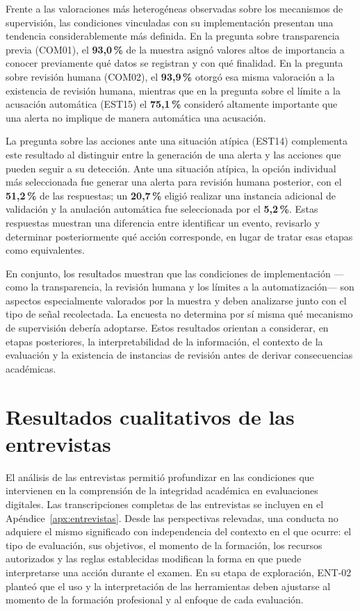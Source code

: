 Frente a las valoraciones más heterogéneas observadas sobre los mecanismos de supervisión, las condiciones vinculadas con su implementación presentan una tendencia considerablemente más definida. En la pregunta sobre transparencia previa (COM01), el \textbf{93,0\,\%} de la muestra asignó valores altos de importancia a conocer previamente qué datos se registran y con qué finalidad. En la pregunta sobre revisión humana (COM02), el \textbf{93,9\,\%} otorgó esa misma valoración a la existencia de revisión humana, mientras que en la pregunta sobre el límite a la acusación automática (EST15) el \textbf{75,1\,\%} consideró altamente importante que una alerta no implique de manera automática una acusación.

La pregunta sobre las acciones ante una situación atípica (EST14) complementa este resultado al distinguir entre la generación de una alerta y las acciones que pueden seguir a su detección. Ante una situación atípica, la opción individual más seleccionada fue generar una alerta para revisión humana posterior, con el \textbf{51,2\,\%} de las respuestas; un \textbf{20,7\,\%} eligió realizar una instancia adicional de validación y la anulación automática fue seleccionada por el \textbf{5,2\,\%}. Estas respuestas muestran una diferencia entre identificar un evento, revisarlo y determinar posteriormente qué acción corresponde, en lugar de tratar esas etapas como equivalentes.

En conjunto, los resultados muestran que las condiciones de implementación ---como la transparencia, la revisión humana y los límites a la automatización--- son aspectos especialmente valorados por la muestra y deben analizarse junto con el tipo de señal recolectada. La encuesta no determina por sí misma qué mecanismo de supervisión debería adoptarse. Estos resultados orientan a considerar, en etapas posteriores, la interpretabilidad de la información, el contexto de la evaluación y la existencia de instancias de revisión antes de derivar consecuencias académicas.

\section{Resultados cualitativos de las entrevistas}

El análisis de las entrevistas permitió profundizar en las condiciones que intervienen en la comprensión de la integridad académica en evaluaciones digitales. Las transcripciones completas de las entrevistas se incluyen en el Apéndice~\ref{apx:entrevistas}. Desde las perspectivas relevadas, una conducta no adquiere el mismo significado con independencia del contexto en el que ocurre: el tipo de evaluación, sus objetivos, el momento de la formación, los recursos autorizados y las reglas establecidas modifican la forma en que puede interpretarse una acción durante el examen. En su etapa de exploración, ENT-02 planteó que el uso y la interpretación de las herramientas deben ajustarse al momento de la formación profesional y al enfoque de cada evaluación.

